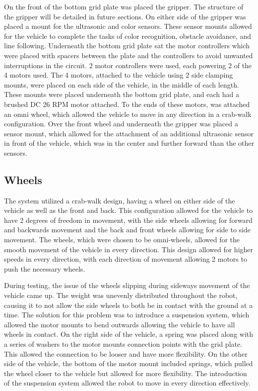 \documentclass[11pt]{report}
\begin{document}
\par On the front of the bottom grid plate was placed the gripper. The structure of the gripper will be detailed in future sections. On either side of the gripper was placed a mount for the ultrasonic and color sensors. These sensor mounts allowed for the vehicle to complete the tasks of color recognition, obstacle avoidance, and line following. Underneath the bottom grid plate sat the motor controllers which were placed with spacers between the plate and the controllers to avoid unwanted interruptions in the circuit. 2 motor controllers were used, each powering 2 of the 4 motors used. The 4 motors, attached to the vehicle using 2 side clamping mounts, were placed on each side of the vehicle, in the middle of each length. These mounts were placed underneath the bottom grid plate, and each had a brushed \gls{DC} 26 \gls{RPM} motor attached. To the ends of these motors, was attached an omni wheel, which allowed the vehicle to move in any direction in a crab-walk configuration. Over the front wheel and underneath the gripper was placed a sensor mount, which allowed for the attachment of an additional ultrasonic sensor in front of the vehicle, which was in the center and further forward than the other sensors. 
\subsection{Wheels}
The system utilized a crab-walk design, having a wheel on either side of the vehicle as well as the front and back. This configuration allowed for the vehicle to have 2 degrees of freedom in movement, with the side wheels allowing for forward and backwards movement and the back and front wheels allowing for side to side movement. The wheels, which were chosen to be omni-wheels, allowed for the smooth movement of the vehicle in every direction. This design allowed for higher speeds in every direction, with each direction of movement allowing 2 motors to push the necessary wheels. 
\par During testing, the issue of the wheels slipping during sideways movement of the vehicle came up. The weight was unevenly distributed throughout the robot, causing it to not allow the side wheels to both be in contact with the ground at a time. The solution for this problem was to introduce a suspension system, which allowed the motor mounts to bend outwards allowing the vehicle to have all wheels in contact. On the right side of the vehicle, a spring was placed along with a series of washers to the motor mounts connection points with the grid plate. This allowed the connection to be looser and have more flexibility. On the other side of the vehicle, the bottom of the motor mount included springs, which pulled the wheel closer to the vehicle but allowed for more flexibility. The introduction of the suspension system allowed the robot to move in every direction effectively. 
\end{document}
